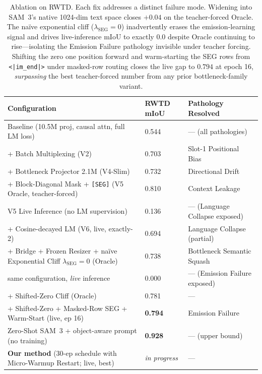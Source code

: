 \documentclass{article}
\begin{document}
\begin{table}[h]
\centering
\small
\begin{tabular}{lll}
\toprule
\textbf{Configuration} & \textbf{RWTD mIoU} & \textbf{Pathology Resolved} \\
\midrule
Baseline (10.5M proj, causal attn, full LM loss) & 0.544 & --- (all pathologies) \\
+ Batch Multiplexing (V2) & 0.703 & Slot-1 Positional Bias \\
+ Bottleneck Projector 2.1M (V4-Slim) & 0.732 & Directional Drift \\
+ Block-Diagonal Mask + \texttt{[SEG]} (V5 Oracle, teacher-forced) & 0.810 & Context Leakage \\
V5 Live Inference (no LM supervision) & 0.136 & --- (Language Collapse exposed) \\
+ Cosine-decayed LM (V6, live, exactly-2) & 0.694 & Language Collapse (partial) \\
+ Bridge + Frozen Resizer + na\"ive Exponential Cliff $\lambda_{\text{SEG}} = 0$ (Oracle) & 0.738 & Bottleneck Semantic Squash \\
\quad same configuration, \emph{live} inference & 0.000 & --- (Emission Failure exposed) \\
+ Shifted-Zero Cliff (Oracle) & 0.781 & --- \\
+ Shifted-Zero + Masked-Row SEG + Warm-Start (live, ep 16) & \textbf{0.794} & Emission Failure \\
Zero-Shot SAM~3 + object-aware prompt (no training) & \textbf{0.928} & --- (upper bound) \\
\textbf{Our method} (30-ep schedule with Micro-Warmup Restart; live, best) & \emph{in progress} & --- \\
\bottomrule
\end{tabular}
\caption{Ablation on RWTD. Each fix addresses a distinct failure mode. Widening into SAM~3's native 1024-dim text space closes $+0.04$ on the teacher-forced Oracle. The na\"ive exponential cliff ($\lambda_{\text{SEG}} = 0$) inadvertently erases the emission-learning signal and drives live-inference mIoU to exactly $0.0$ despite Oracle continuing to rise---isolating the Emission Failure pathology invisible under teacher forcing. Shifting the zero one position forward and warm-starting the SEG rows from \texttt{<|im\_end|>} under masked-row routing closes the live gap to $0.794$ at epoch 16, \emph{surpassing} the best teacher-forced number from any prior bottleneck-family variant.}
\label{tab:ablation}
\end{table}
\end{document}

